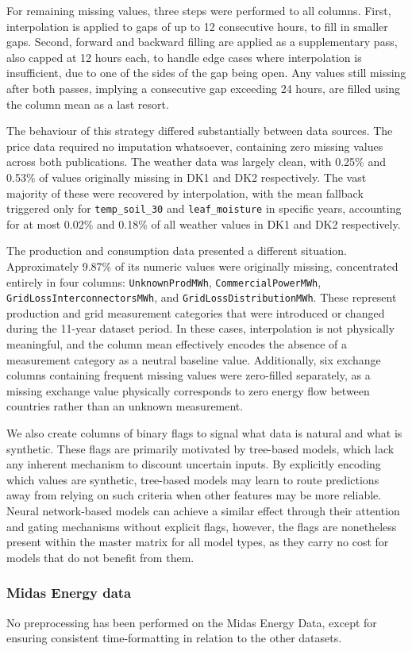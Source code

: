 For remaining missing values, three steps were performed to all columns. First, 
interpolation is applied to gaps of up to 12 consecutive hours, to fill in 
smaller gaps. Second, forward and backward filling are applied as a 
supplementary pass, also capped at 12 hours each, to handle edge cases where 
interpolation is insufficient, due to one of the 
sides of the gap being open. 
Any values still missing after both passes, implying a consecutive gap 
exceeding 24 hours, are filled using the column mean as a last resort.

The behaviour of this strategy differed substantially between data 
sources. The price data required no imputation whatsoever, containing 
zero missing values across both publications. The weather data was 
largely clean, with 0.25\% and 0.53\% of values originally missing 
in DK1 and DK2 respectively. The vast majority of these were 
recovered by interpolation, with the mean fallback triggered only for 
\texttt{temp\_soil\_30} and \texttt{leaf\_moisture} in specific years, 
accounting for at most 0.02\% and 0.18\% of all weather values in DK1 
and DK2 respectively. 

The production and consumption data presented a different situation. 
Approximately 9.87\% of its numeric values were 
originally missing, concentrated entirely in four columns: 
\texttt{UnknownProdMWh}, \texttt{CommercialPowerMWh}, 
\texttt{GridLossInterconnectorsMWh}, and 
\texttt{GridLossDistributionMWh}. These represent production and grid 
measurement categories that were introduced or changed during the 
11-year dataset period. In these cases, interpolation is not physically 
meaningful, and the column mean effectively encodes the absence of a 
measurement category as a neutral baseline value. Additionally, six exchange 
columns containing frequent missing values were zero-filled separately, as a 
missing exchange value physically corresponds to zero energy flow between 
countries rather than an unknown measurement.

We also create columns of binary flags to signal what data is natural and what 
is synthetic. These flags are primarily motivated by 
tree-based models, which lack any inherent mechanism to discount 
uncertain inputs. By explicitly encoding which values are synthetic, tree-based 
models may learn to route predictions away from relying on such criteria when 
other features may be more reliable. Neural network-based 
models can achieve a similar effect through their attention and gating 
mechanisms without explicit flags, however, the flags are nonetheless present 
within the master matrix for all model types, as 
they carry no cost for models 
that do not benefit from them.\\

\subsubsection{Midas Energy data}
No preprocessing has been performed on the Midas Energy Data, except for 
ensuring consistent time-formatting in relation to the other datasets. 

